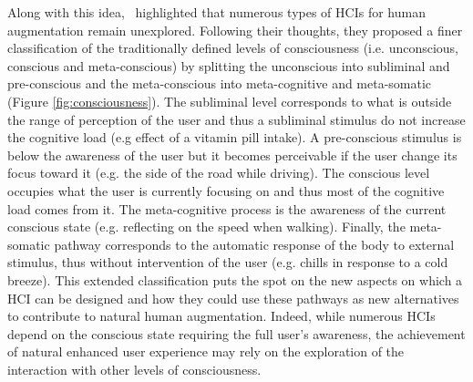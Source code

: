 Along with this idea,~\citet{Jain2020-og} highlighted that numerous types of HCIs for human augmentation remain unexplored. Following their thoughts, they proposed a finer classification of the traditionally defined levels of consciousness (i.e. unconscious, conscious and meta-conscious) by splitting the unconscious into subliminal and pre-conscious and the meta-conscious into meta-cognitive and meta-somatic (Figure \ref{fig:consciousness}). The subliminal level corresponds to what is outside the range of perception of the user and thus a subliminal stimulus do not increase the cognitive load (e.g effect of a vitamin pill intake). A pre-conscious stimulus is below the awareness of the user but it becomes perceivable if the user change its focus toward it (e.g. the side of the road while driving). The conscious level occupies what the user is currently focusing on and thus most of the cognitive load comes from it. The meta-cognitive process is the awareness of the current conscious state (e.g. reflecting on the speed when walking). Finally, the meta-somatic pathway corresponds to the automatic response of the body to external stimulus, thus without intervention of the user (e.g. chills in response to a cold breeze).
This extended classification puts the spot on the new aspects on which a HCI can be designed and how they could use these pathways as new alternatives to contribute to natural human augmentation. Indeed, while numerous HCIs depend on the conscious state requiring the full user's awareness, the achievement of natural enhanced user experience may rely on the exploration of the interaction with other levels of consciousness.